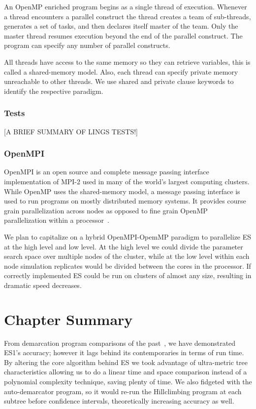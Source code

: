 An OpenMP enriched program begins as a single thread of execution.
Whenever a thread encounters a parallel construct the thread creates a team of sub-threads, generates a set of tasks, and then declares itself master of the team.
Only the master thread resumes execution beyond the end of the parallel construct.
The program can specify any number of parallel constructs.

All threads have access to the same memory so they can retrieve variables, this is called a shared-memory model.
Also, each thread can specify private memory unreachable to other threads.
We use shared and private clause keywords to identify the respective paradigm.

\subsubsection*{Tests}
[A BRIEF SUMMARY OF LINGS TESTS!]

\subsubsection*{OpenMPI}
OpenMPI is an open source and complete message passing interface implementation of MPI-2 used in many of the world's largest computing clusters.
While OpenMP uses the shared-memory model, a message passing interface is used to run programs on mostly distributed memory systems.
It provides course grain parallelization across nodes as opposed to fine grain OpenMP parallelization within a processor~\cite{gabriel04:_open_mpi}.

We plan to capitalize on a hybrid OpenMPI-OpemMP paradigm to parallelize ES at the high level and low level.
At the high level we could divide the parameter search space over multiple nodes of the cluster, while at the low level within each node simulation replicates would be divided between the cores in the processor.
If correctly implemented ES could be run on clusters of almost any size, resulting in dramatic speed decreases.


\section{Chapter Summary}
From demarcation program comparisons of the past~\cite{carlo}, we have demonstrated ES1's accuracy; however it lags behind its contemporaries in terms of run time.
By altering the core algorithm behind ES we took advantage of ultra-metric tree characteristics allowing us to do a linear time and space comparison instead of a polynomial complexity technique, saving plenty of time.
We also fidgeted with the auto-demarcator program, so it would re-run the Hillclimbing program at each subtree before confidence intervals, theoretically increasing accuracy as well.

